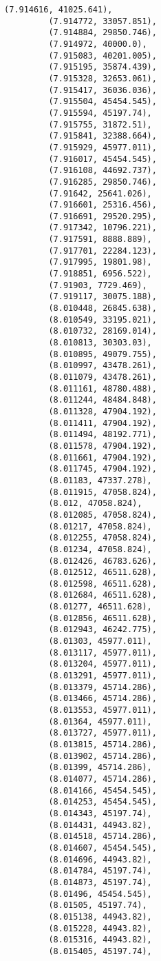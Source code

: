 \documentclass[11pt]{article}
\begin{document}
\begin{Verbatim}[commandchars=\\\{\}]
         (7.914616, 41025.641),
         (7.914772, 33057.851),
         (7.914884, 29850.746),
         (7.914972, 40000.0),
         (7.915083, 40201.005),
         (7.915195, 35874.439),
         (7.915328, 32653.061),
         (7.915417, 36036.036),
         (7.915504, 45454.545),
         (7.915594, 45197.74),
         (7.915755, 31872.51),
         (7.915841, 32388.664),
         (7.915929, 45977.011),
         (7.916017, 45454.545),
         (7.916108, 44692.737),
         (7.916285, 29850.746),
         (7.91642, 25641.026),
         (7.916601, 25316.456),
         (7.916691, 29520.295),
         (7.917342, 10796.221),
         (7.917591, 8888.889),
         (7.917701, 22284.123),
         (7.917995, 19801.98),
         (7.918851, 6956.522),
         (7.91903, 7729.469),
         (7.919117, 30075.188),
         (8.010448, 26845.638),
         (8.010549, 33195.021),
         (8.010732, 28169.014),
         (8.010813, 30303.03),
         (8.010895, 49079.755),
         (8.010997, 43478.261),
         (8.011079, 43478.261),
         (8.011161, 48780.488),
         (8.011244, 48484.848),
         (8.011328, 47904.192),
         (8.011411, 47904.192),
         (8.011494, 48192.771),
         (8.011578, 47904.192),
         (8.011661, 47904.192),
         (8.011745, 47904.192),
         (8.01183, 47337.278),
         (8.011915, 47058.824),
         (8.012, 47058.824),
         (8.012085, 47058.824),
         (8.01217, 47058.824),
         (8.012255, 47058.824),
         (8.01234, 47058.824),
         (8.012426, 46783.626),
         (8.012512, 46511.628),
         (8.012598, 46511.628),
         (8.012684, 46511.628),
         (8.01277, 46511.628),
         (8.012856, 46511.628),
         (8.012943, 46242.775),
         (8.01303, 45977.011),
         (8.013117, 45977.011),
         (8.013204, 45977.011),
         (8.013291, 45977.011),
         (8.013379, 45714.286),
         (8.013466, 45714.286),
         (8.013553, 45977.011),
         (8.01364, 45977.011),
         (8.013727, 45977.011),
         (8.013815, 45714.286),
         (8.013902, 45714.286),
         (8.01399, 45714.286),
         (8.014077, 45714.286),
         (8.014166, 45454.545),
         (8.014253, 45454.545),
         (8.014343, 45197.74),
         (8.014431, 44943.82),
         (8.014518, 45714.286),
         (8.014607, 45454.545),
         (8.014696, 44943.82),
         (8.014784, 45197.74),
         (8.014873, 45197.74),
         (8.01496, 45454.545),
         (8.01505, 45197.74),
         (8.015138, 44943.82),
         (8.015228, 44943.82),
         (8.015316, 44943.82),
         (8.015405, 45197.74),

\end{Verbatim}
\end{document}
